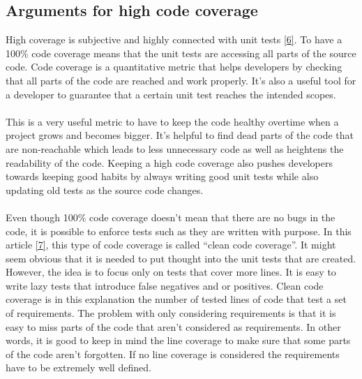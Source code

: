 \documentclass{article}
\begin{document}
\subsection{Arguments for high code coverage}
High coverage is subjective and highly connected with unit tests \hyperlink{6}{[6]}. To have a 100\% code coverage means that the unit tests are accessing all parts of the source code. Code coverage is a quantitative metric that helps developers by checking that all parts of the code are reached and work properly. It's also a useful tool for a developer to guarantee that a certain unit test reaches the intended scopes. 
\\\\
This is a very useful metric to have to keep the code healthy overtime when a project grows and becomes bigger. It's helpful to find dead parts of the code that are non-reachable which leads to less unnecessary code as well as heightens the readability of the code. Keeping a high code coverage also pushes developers towards keeping good habits by always writing good unit tests while also updating old tests as the source code changes. 
\\\\
Even though 100\% code coverage doesn't mean that there are no bugs in the code, it is possible to enforce tests such as they are written with purpose. In this article \hyperlink{7}{[7]}, this type of code coverage is called “clean code coverage”. It might seem obvious that it is needed to put thought into the unit tests that are created. However, the idea is to focus only on tests that cover more lines. It is easy to write lazy tests that introduce false negatives and or positives. Clean code coverage is in this explanation the number of tested lines of code that test a set of requirements. The problem with only considering requirements is that it is easy to miss parts of the code that aren't considered as requirements. In other words, it is good to keep in mind the line coverage to make sure that some parts of the code aren't forgotten. If no line coverage is considered the requirements have to be extremely well defined.
\end{document}
